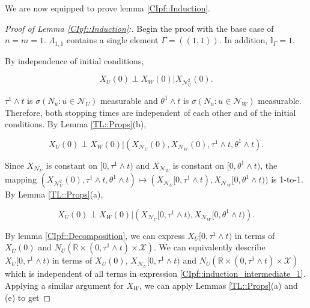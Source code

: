 \documentclass[12pt]{article}
\newcommand{\mb}{\mathbb}
\newcommand{\mc}{\mathcal}
\newcommand{\ov}{\overline}
\newcommand{\ind}{\hspace{24pt}}
\newcommand{\sta}{\mc{X}}							%
\newcommand{\neigh}[1]{\mc{N}_{#1}}					%
\newcommand{\dneigh}[1]{\mc{N}^2_{#1}}				%
\newcommand{\cl}[1]{\ov{#1}}						%
\newcommand{\indx}[1]{^{#1}}						%
\newcommand{\Xf}{X}									%
\newcommand{\poiss}{N}								%
\newcommand{\poissv}[1]{_{#1}}						%
\newcommand{\vind}[1]{_{#1}}						%
\newcommand{\tme}[1]{(#1)}							%
\newcommand{\tmi}[1]{#1}							%
\newcommand{\rt}{\tau}								%
\newcommand{\seto}{U}								%
\newcommand{\sett}{W}								%
\newcommand{\rtt}{\theta}							%
\newcommand{\apath}{\Gamma}						%
\newcommand{\pathset}[2]{\Lambda_{#1,#2}}		%
\newcommand{\indo}{n}							%
\newcommand{\indt}{m}							%
\begin{document}
We are now equipped to prove lemma \ref{CIpf::Induction}.

\begin{proof}[Proof of Lemma \ref{CIpf::Induction}:]

Begin the proof with the base case of \(\indo=\indt =1\). \(\pathset{1}{1}\) contains a single element \(\apath = ((1,1))\). In addition, \(\mb{I}_{\apath} = 1\).

\ind By independence of initial conditions,

\[\Xf\vind{\seto}\tme{0}\perp \Xf\vind{\sett}\tme{0}|\Xf\vind{\dneigh{\seto}}\tme{0}.\]

\(\rt\indx{1}\wedge t\) is \(\sigma\left(\poiss\poissv{u}:u\in \neigh{\seto}\right)\) measurable and \(\rtt\indx{1}\wedge t\) is \(\sigma\left(\poiss\poissv{u}:u\in \neigh{\sett}\right)\) measurable. Therefore, both stopping times are independent of each other and of the initial conditions. By Lemma \ref{TL::Props}(b), 

\[\Xf\vind{\seto}\tme{0}\perp \Xf\vind{\sett}\tme{0}|\left(\Xf\vind{\neigh{\seto}}\tme{0},\Xf\vind{\neigh{\sett}}\tme{0},\rt\indx{1}\wedge t,\rtt\indx{1}\wedge t\right).\]

Since \(\Xf\vind{\neigh{\seto}}\) is constant on \([0,\rt\indx{1}\wedge t)\) and \(\Xf\vind{\neigh{\sett}}\) is constant on \([0,\rtt\indx{1}\wedge t)\), the mapping \((\Xf\vind{\dneigh{\seto}}\tme{0},\rt\indx{1}\wedge t,\rtt\indx{1}\wedge t) \mapsto (\Xf\vind{\neigh{\seto}}\tmi{[0,\rt\indx{1}\wedge t)},\Xf\vind{\neigh{\sett}}\tmi{[0,\rtt\indx{1}\wedge t)})\) is 1-to-1. By Lemma \ref{TL::Props}(a),

\begin{equation}
\Xf\vind{\seto}\tme{0}\perp \Xf\vind{\sett}\tme{0}|\left(\Xf\vind{\neigh{\seto}}\tmi{[0,\rt\indx{1}\wedge t)},\Xf\vind{\neigh{\sett}}\tmi{[0,\rtt\indx{1}\wedge t)}\right).
\label{CIpf::induction_intermediate_1}
\end{equation}

By lemma \ref{CIpf::Decomposition}, we can express \(\Xf\vind{\seto}\tmi{[0,\rt\indx{1}\wedge t)}\) in terms of \(\Xf\vind{\cl{\seto}}\tme{0}\) and \(\poiss\poissv{\seto}(\mb{R} \times (0,\rt\indx{1}\wedge t)\times\sta)\). We can equivalently describe \(\Xf\vind{\seto}\tmi{[0,\rt\indx{1}\wedge t)}\) in terms of \(\Xf\vind{\seto}\tme{0}\), \(\Xf\vind{\neigh{\seto}}\tmi{[0,\rt\indx{1}\wedge t)}\) and \(\poiss\poissv{\seto}(\mb{R}\times (0,\rt\indx{1}\wedge t)\times \sta)\) which is independent of all terms in expression \eqref{CIpf::induction_intermediate_1}. Applying a similar argument for \(\Xf\vind{\sett}\), we can apply Lemmas \ref{TL::Props}(a) and (e) to get


\end{proof}
\end{document}
